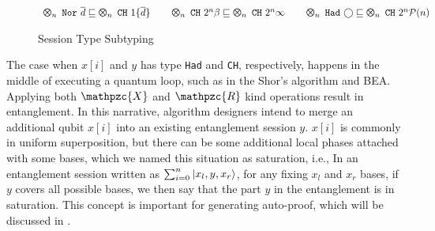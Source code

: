 \begin{figure}[t]
{\small
$
\begin{array}{l}
\ttype{n}{\tnor{\overline{d}}} \sqsubseteq \ttype{n}{\tch{1}{\{\overline{d}\}}}
\qquad 
\ttype{n}{\tch{2^n}{\beta}} \sqsubseteq \ttype{n}{\tch{2^n}{\infty}}
\qquad 
\ttype{n}{\thad{\bigcirc}} \sqsubseteq \ttype{n}{\tch{2^n}{\tpower{n}}}
\end{array}
$
}
  \caption{Session Type Subtyping}
  \label{fig:exp-subtyping}
\end{figure}

The case when $x[i]$ and $y$ has type \texttt{Had} and \texttt{CH}, respectively,
happens in the middle of executing a quantum loop, such as in the Shor's algorithm and BEA.
Applying both $\mathpzc{X}$ and $\mathpzc{R}$ kind operations result in entanglement.
In this narrative, algorithm designers intend to
merge an additional qubit $x[i]$ into an existing entanglement session $y$.
$x[i]$ is commonly in uniform superposition,
but there can be some additional local phases attached with some bases,
which we named this situation as saturation, i.e.,
In an entanglement session written as $\sum_{i=0}^n \left\vert{x_l,y,x_r}\right\rangle$,
for any fixing $x_l$ and $x_r$ bases, if $y$ covers all possible bases,
we then say that the part $y$ in the entanglement is in saturation.
This concept is important for generating auto-proof, which will be discussed in .

